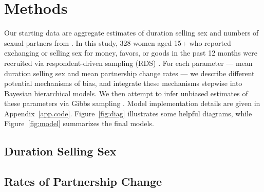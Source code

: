 \section{Methods}\label{meth}
Our starting data are aggregate estimates of
duration selling sex and numbers of sexual partners from \cite{Baral2014}.
In this study, 328 women aged 15+
who reported exchanging or selling sex for money, favors, or goods in the past 12 months
were recruited via respondent-driven sampling (RDS) \cite{Heckathorn1997}.
For each parameter --- mean duration selling sex and mean partnership change rates ---
we describe different potential mechanisms of bias,
and integrate these mechanisms stepwise into Bayesian hierarchical models.
We then attempt to infer unbiased estimates of these parameters
via Gibbs sampling \cite{Geman1984}.
Model implementation details are given in Appendix~\ref{app.code}.
Figure~\ref{fig:diag} illustrates some helpful diagrams, while
Figure~\ref{fig:model} summarizes the final models.

\subsection{Duration Selling Sex}\label{meth.yss}


\pagebreak %
\subsection{Rates of Partnership Change}\label{meth.parts}


